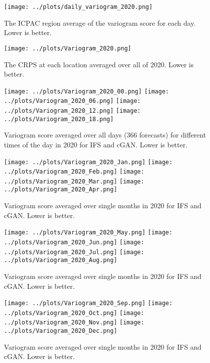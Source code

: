 \documentclass[12pt]{article}
\begin{document}
\begin{figure}
\begin{center}
\texttt{[image: ../plots/daily\_variogram\_2020.png]}
\end{center}
\caption{The ICPAC region average of the variogram score for each day. Lower is better.}
\end{figure}

\begin{figure}
\begin{center}
\texttt{[image: ../plots/Variogram\_2020.png]}
\end{center}
\caption{The CRPS at each location averaged over all of 2020. Lower is better.}
\end{figure}

\begin{figure}
\begin{center}
\texttt{[image: ../plots/Variogram\_2020\_00.png]}
\texttt{[image: ../plots/Variogram\_2020\_06.png]}
\texttt{[image: ../plots/Variogram\_2020\_12.png]}
\texttt{[image: ../plots/Variogram\_2020\_18.png]}
\end{center}
\caption{Variogram score averaged over all days (366 forecasts) for different times of the day in 2020 for IFS and cGAN. Lower is better.}
\end{figure}

\begin{figure}
\begin{center}
\texttt{[image: ../plots/Variogram\_2020\_Jan.png]}
\texttt{[image: ../plots/Variogram\_2020\_Feb.png]}
\texttt{[image: ../plots/Variogram\_2020\_Mar.png]}
\texttt{[image: ../plots/Variogram\_2020\_Apr.png]}
\end{center}
\caption{Variogram score averaged over single months in 2020 for IFS and cGAN. Lower is better.}
\end{figure}

\begin{figure}
\begin{center}
\texttt{[image: ../plots/Variogram\_2020\_May.png]}
\texttt{[image: ../plots/Variogram\_2020\_Jun.png]}
\texttt{[image: ../plots/Variogram\_2020\_Jul.png]}
\texttt{[image: ../plots/Variogram\_2020\_Aug.png]}
\end{center}
\caption{Variogram score averaged over single months in 2020 for IFS and cGAN. Lower is better.}
\end{figure}

\begin{figure}
\begin{center}
\texttt{[image: ../plots/Variogram\_2020\_Sep.png]}
\texttt{[image: ../plots/Variogram\_2020\_Oct.png]}
\texttt{[image: ../plots/Variogram\_2020\_Nov.png]}
\texttt{[image: ../plots/Variogram\_2020\_Dec.png]}
\end{center}
\caption{Variogram score averaged over single months in 2020 for IFS and cGAN. Lower is better.}
\end{figure}
\end{document}
